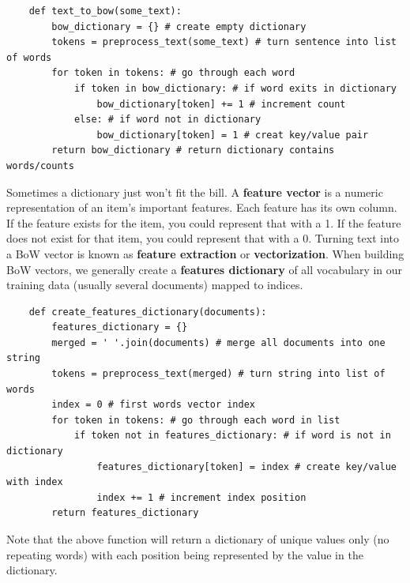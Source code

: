 \documentclass[11pt, a4paper]{article}
\begin{document}
\begin{spacing}{1.1}
\begin{lstlisting}
	def text_to_bow(some_text):
		bow_dictionary = {} # create empty dictionary
		tokens = preprocess_text(some_text) # turn sentence into list of words
		for token in tokens: # go through each word
			if token in bow_dictionary: # if word exits in dictionary
				bow_dictionary[token] += 1 # increment count
			else: # if word not in dictionary
				bow_dictionary[token] = 1 # creat key/value pair
		return bow_dictionary # return dictionary contains words/counts	\end{lstlisting} \vspace*{1mm}
	Sometimes a dictionary just won’t fit the bill. A \textbf{feature vector} is a numeric representation of an item’s important features. Each feature has its own column. If the feature exists for the item, you could represent that with a 1. If the feature does not exist for that item, you could represent that with a 0. Turning text into a BoW vector is known as \textbf{feature extraction} or \textbf{vectorization}. When building BoW vectors, we generally create a \textbf{features dictionary} of all vocabulary in our training data (usually several documents) mapped to indices. 
	\begin{lstlisting}
	def create_features_dictionary(documents):
		features_dictionary = {}
		merged = ' '.join(documents) # merge all documents into one string
		tokens = preprocess_text(merged) # turn string into list of words
		index = 0 # first words vector index
		for token in tokens: # go through each word in list
			if token not in features_dictionary: # if word is not in dictionary
				features_dictionary[token] = index # create key/value with index
				index += 1 # increment index position
		return features_dictionary	\end{lstlisting} \vspace*{1mm}
	Note that the above function will return a dictionary of unique values only (no repeating words) with each position being represented by the value in the dictionary. \newpage


\end{spacing}
\end{document}
